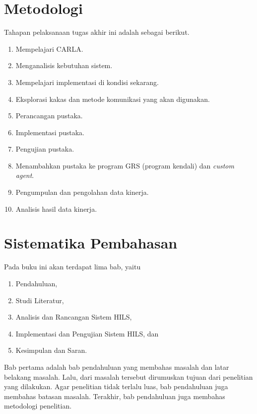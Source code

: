 \section{Metodologi}


Tahapan pelaksanaan tugas akhir ini adalah sebagai berikut.

\begin{enumerate}
	\item Mempelajari CARLA.
	\item Menganalisis kebutuhan sistem.
	\item Mempelajari implementasi di kondisi sekarang.
	\item Eksplorasi kakas dan metode komunikasi yang akan digunakan.
	\item Perancangan pustaka.
	\item Implementasi pustaka.
	\item Pengujian pustaka.
	\item Menambahkan pustaka ke program GRS (program kendali) dan
	      \textit{custom agent}.
	\item Pengumpulan dan pengolahan data kinerja.
	\item Analisis hasil data kinerja.
\end{enumerate}

\section{Sistematika Pembahasan}


Pada buku ini akan terdapat lima bab, yaitu
\begin{enumerate}
	\item Pendahuluan,
	\item Studi Literatur,
	\item Analisis dan Rancangan Sistem HILS,
	\item Implementasi dan Pengujian Sistem HILS, dan
	\item Kesimpulan dan Saran.
\end{enumerate}

Bab pertama adalah bab pendahuluan yang membahas masalah dan latar belakang
masalah. Lalu, dari masalah tersebut dirumuskan tujuan dari penelitian yang
dilakukan. Agar penelitian tidak terlalu luas, bab pendahuluan juga membahas
batasan masalah. Terakhir, bab pendahuluan juga membahas metodologi penelitian.

